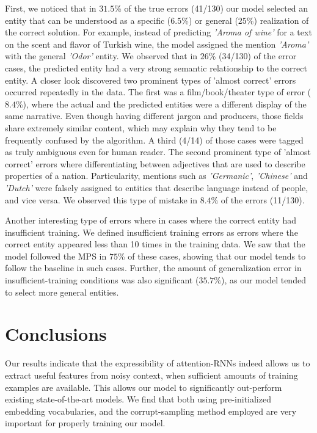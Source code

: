\documentclass[11pt,letterpaper]{article}
\begin{document}
	First, we noticed that in $31.5$\% of the true errors (41/130) our model selected an entity that can be understood as a specific ($6.5$\%) or general ($25$\%) realization of the correct solution. For example, instead of predicting \textit{'Aroma of wine'} for a text on the scent and flavor of Turkish wine, the model assigned the mention \textit{'Aroma'} with the general \textit{'Odor'} entity. We observed that in $26$\% (34/130) of the error cases, the predicted entity had a very strong semantic relationship to the correct entity. A closer look discovered two prominent types of 'almost correct' errors occurred repeatedly in the data. The first was a film/book/theater type of error ($8.4$\%), where the actual and the predicted entities were a different display of the same narrative. Even though having different jargon and producers, those fields share extremely similar content, which may explain why they tend to be frequently confused by the algorithm. A third (4/14) of those cases were tagged as truly ambiguous even for human reader. The second prominent type of 'almost correct' errors where differentiating between adjectives that are used to describe properties of a nation. Particularity, mentions such as \textit{'Germanic'}, \textit{'Chinese'} and \textit{'Dutch'} were falsely assigned to entities that describe language instead of people, and vice versa. We observed this type of mistake in $8.4$\% of the errors (11/130).
	
	Another interesting type of errors where in cases where the correct entity had insufficient training. We defined insufficient training errors as errors where the correct entity appeared less than 10 times in the training data. We saw that the model followed the MPS in $75$\% of these cases, showing that our model tends to follow the baseline in such cases. Further, the amount of generalization error in insufficient-training conditions was also significant ($35.7\%$), as our model tended to select more general entities.
	
	\section{Conclusions}
	Our results indicate that the expressibility of attention-RNNs indeed allows us to extract useful features from noisy context, when sufficient amounts of training examples are available. This allows our model to significantly out-perform existing state-of-the-art models. We find that both using pre-initialized embedding vocabularies, and the corrupt-sampling method employed are very important for properly training our model.
	
\end{document}
